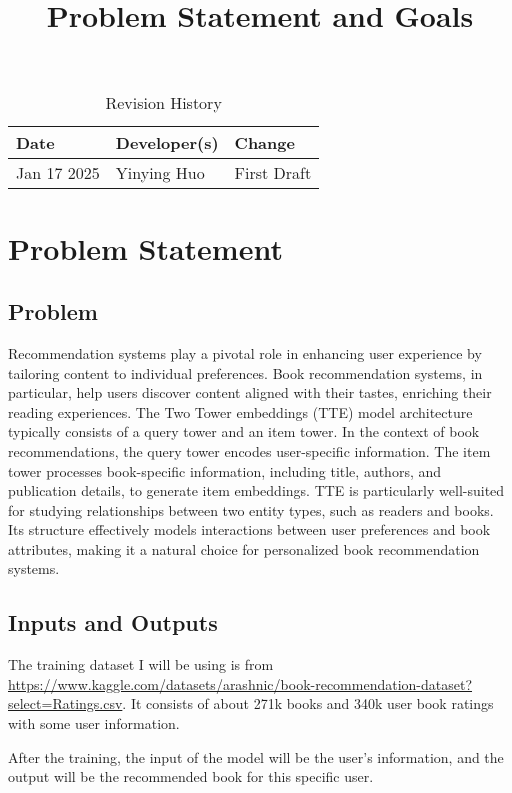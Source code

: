 \documentclass{article}
\title{Problem Statement and Goals\\\progname}
\author{\authname}
\date{}
\begin{document}
\maketitle

\begin{table}[hp]
\caption{Revision History} \label{TblRevisionHistory}
\begin{tabularx}{\textwidth}{llX}
\toprule
\textbf{Date} & \textbf{Developer(s)} & \textbf{Change}\\
\midrule
Jan 17 2025 & Yinying Huo & First Draft \\
\bottomrule
\end{tabularx}
\end{table}

\section{Problem Statement}

\subsection{Problem}
Recommendation systems play a pivotal role in enhancing user experience by tailoring content to individual preferences. Book recommendation systems, in particular, help users discover content aligned with their tastes, enriching their reading experiences. The Two Tower embeddings (TTE) model architecture typically consists of a query tower and an item tower. In the context of book recommendations, the query tower encodes user-specific information. The item tower processes book-specific information, including title, authors, and publication details, to generate item embeddings. TTE is particularly well-suited for studying relationships between two entity types, such as readers and books. Its structure effectively models interactions between user preferences and book attributes, making it a natural choice for personalized book recommendation systems.

\subsection{Inputs and Outputs}

The training dataset I will be using is from \url{https://www.kaggle.com/datasets/arashnic/book-recommendation-dataset?select=Ratings.csv}. It consists of about 271k books and 340k user book ratings with some user information.

After the training, the input of the model will be the user's information, and the output will be the recommended book for this specific user.
\end{document}
